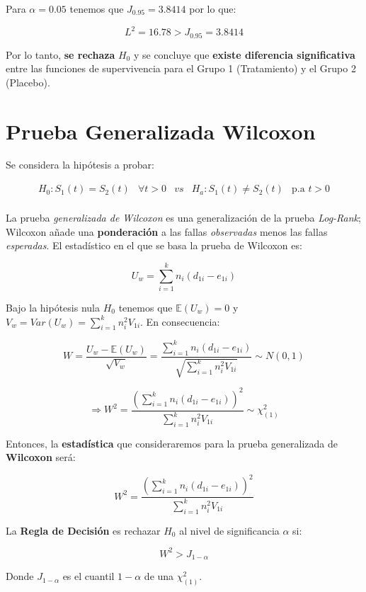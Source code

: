 \documentclass[
  a4paper,
  oneside,
  openany]{book}
\begin{document}
Para \(\alpha=0.05\) tenemos que \(J_{0.95}=3.8414\) por lo que:

\[
L^2=16.78>J_{0.95}=3.8414
\]

Por lo tanto, \textbf{se rechaza} \(H_0\) y se concluye que \textbf{existe diferencia significativa} entre las funciones de supervivencia para el Grupo 1 (Tratamiento) y el Grupo 2 (Placebo).

\hypertarget{prueba-generalizada-wilcoxon}{%
\section{Prueba Generalizada Wilcoxon}\label{prueba-generalizada-wilcoxon}}

Se considera la hipótesis a probar:

\[
\begin{array}{lllll}
H_{0}:S_{1}(t) = S_{2}(t) & \forall t>0 & vs & H_{a}:S_{1}(t) \neq S_{2}(t) & \mbox{p.a } t>0\\
\end{array}
\]

La prueba \emph{generalizada de Wilcoxon} es una generalización de la prueba \emph{Log-Rank}; Wilcoxon añade una \textbf{ponderación} a las fallas \emph{observadas} menos las fallas \emph{esperadas}. El estadístico en el que se basa la prueba de Wilcoxon es:

\[
U_{w} = \sum_{i = 1}^k n_{i}(d_{1i}-e_{1i})
\]

Bajo la hipótesis nula \(H_0\) tenemos que \(\mathbb{E}(U_{w}) = 0\) y \(V_{w} = Var(U_{w}) = \sum_{i=1}^{k}n_{i}^2V_{1i}\). En consecuencia:

\[
W=\frac{U_w-\mathbb{E}(U_{w})}{\sqrt{V_{w}}}=\frac{\sum_{i = 1}^k n_{i}(d_{1i}-e_{1i})}{\sqrt{\sum_{i=1}^{k}n_{i}^2V_{1i}}} \sim N(0,1)
\]

\[
\Longrightarrow W^2= \frac{(\sum_{i = 1}^k n_{i}(d_{1i}-e_{1i}))^2}{\sum_{i=1}^{k}n_{i}^2V_{1i}} \sim \chi^2_{(1)}
\]

Entonces, la \textbf{estadística} que consideraremos para la prueba generalizada de \textbf{Wilcoxon} será:

\[
W^2= \frac{(\sum_{i = 1}^k n_{i}(d_{1i}-e_{1i}))^2}{\sum_{i=1}^{k}n_{i}^2V_{1i}}
\]

La \textbf{Regla de Decisión} es rechazar \(H_0\) al nivel de significancia \(\alpha\) si:

\[
W^2>J_{1-\alpha}
\]

Donde \(J_{1-\alpha}\) es el cuantil \(1-\alpha\) de una \(\chi^2_{(1)}\).
\end{document}
